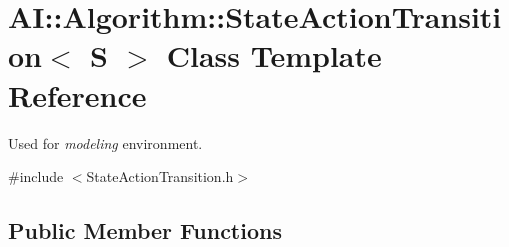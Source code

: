 \hypertarget{classAI_1_1Algorithm_1_1StateActionTransition}{\section{A\+I\+:\+:Algorithm\+:\+:State\+Action\+Transition$<$ S $>$ Class Template Reference}
\label{classAI_1_1Algorithm_1_1StateActionTransition}
}


Used for {\itshape modeling} environment.  




{\ttfamily \#include $<$State\+Action\+Transition.\+h$>$}

\subsection*{Public Member Functions}
